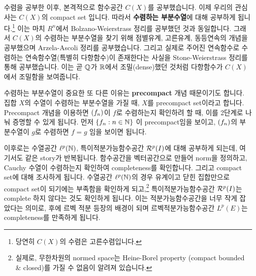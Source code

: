 수렴을 공부한 이후, 본격적으로 함수공간 \(C(X)\)를 공부했습니다. 이제 우리의 관심사는 \(C(X)\)의 compact set 입니다. 따라서 \textbf{수렴하는 부분수열}에 대해 공부하게 됩니다.\footnote{당연히 \(C(X)\)의 수렴은 고른수렴입니다.} 이는 마치 \(R^n\)에서 Bolzano-Weierstrass 정리를 공부했던 것과 동일합니다. 그래서 \(C(X)\)의 수렴하는 부분수열을 찾기 위해 점별유계, 고른유계, 동등연속의 개념을 공부했으며 Arzela-Ascoli 정리를 공부했습니다. 그리고 실제로 주어진 연속함수로 수렴하는 연속함수열(특별히 다항함수)이 존재한다는 사실을 Stone-Weierstrass 정리를 통해 공부했습니다. 이는 곧 \(\mathbb{Q}\)가 \(\mathbb{R}\)에서 조밀(dense)했던 것처럼 다항함수가 \(C(X)\)에서 조밀함을 보여줍니다.

수렴하는 부분수열이 중요한 또 다른 이유는 \textbf{precompact} 개념 때문이기도 합니다. 집합 \(X\)의 수열이 수렴하는 부분수열을 가질 때, \(X\)를 precompact set이라고 합니다. Precompact 개념을 이용하면 \(\left( f_n \right)\)이 \(f\)로 수렴하는지 확인하려 할 때, 이를 2단계로 나눠 증명할 수 있게 됩니다. 먼저 \(\{f_n : n \in \mathbb{N}\}\) 이 precompact임을 보이고, \(\left( f_n \right)\)의 부분수열이 \(g\)로 수렴하면 \(f = g\) 임을 보이면 됩니다.

이후로는 수열공간 \(\ell^p(\mathbb{N})\), 특이적분가능함수공간 \(\mathcal{R}^p(I)\)에 대해 공부하게 되는데, 여기서도 같은 story가 반복됩니다. 함수공간을 벡터공간으로 만들어 norm을 정의하고, Cauchy 수열이 수렴하는지 확인하여 completeness를 확인합니다. 그리고 compact set에 대해 조사하게 됩니다. 수열공간 \(\ell^p(\mathbb{N})\)의 경우 유계이고 닫힌 집합만으로 compact set이 되기에는 부족함을 확인하게 되고,\footnote{실제로, 무한차원의 normed space는 Heine-Borel property (compact \miff bounded \& closed)를 가질 수 없음이 알려져 있습니다.} 특이적분가능함수공간 \(\mathcal{R}^p(I)\)는 complete 하지 않다는 것도 확인하게 됩니다. 이는 적분가능함수공간을 너무 작게 잡았다는 의미로, 후에 르벡 적분 등장의 배경이 되며 르벡적분가능함수공간 \(L^p(E)\)는 completeness를 만족하게 됩니다.

\pagebreak
